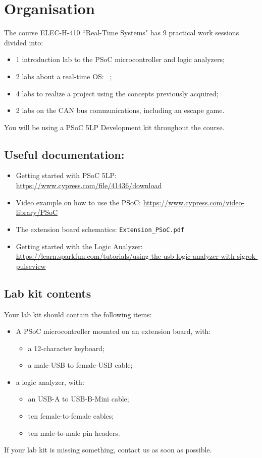 \section*{Organisation}
The course ELEC-H-410 ``Real-Time Systems" has 9 practical work sessions divided into:
\begin{itemize}
		\item 1 introduction lab to the PSoC microcontroller and logic analyzers; 
    \item 2 labs about a real-time OS: \rtos~; 
		\item 4 labs to  realize a project using the concepts previously acquired; 
    \item 2 labs on the CAN bus communications, including an escape game. 
\end{itemize}
You will be using a PSoC 5LP Development kit throughout the course.
 
\subsection*{Useful documentation:}
\begin{itemize}
    \item Getting started with PSoC 5LP: \url{https://www.cypress.com/file/41436/download}
    \item Video example on how to use the PSoC: \url{https://www.cypress.com/video-library/PSoC}
    \item The extension board schematics: \texttt{Extension\_PSoC.pdf}
		\item Getting started with the Logic Analyzer: \url{https://learn.sparkfun.com/tutorials/using-the-usb-logic-analyzer-with-sigrok-pulseview}
\end{itemize}

\subsection*{Lab kit contents}
Your lab kit should contain the following items: 
\begin{itemize}
		\item A PSoC microcontroller mounted on an extension board, with: 
				\begin{itemize}
						\item a 12-character keyboard; 
						\item a male-USB to female-USB cable; 
				\end{itemize}
		\item a logic analyzer, with: 
				\begin{itemize}
						\item an USB-A to USB-B-Mini cable; 
						\item ten female-to-female cables; 
						\item ten male-to-male pin headers. 
				\end{itemize}
\end{itemize}
If your lab kit is missing something, contact us as soon as possible. 

